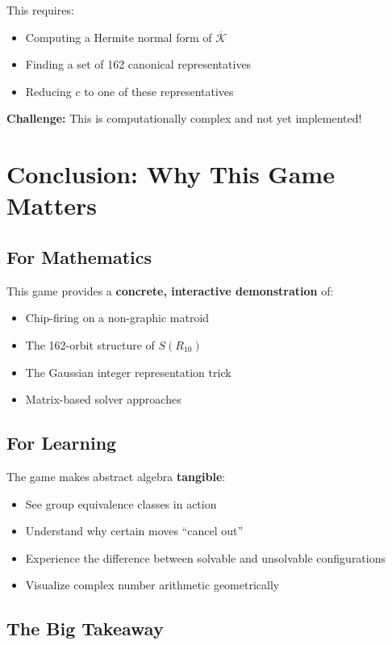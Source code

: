 \documentclass[11pt]{article}
\begin{document}
This requires:
\begin{itemize}
    \item Computing a Hermite normal form of $\overline{\mathcal{K}}$
    \item Finding a set of 162 canonical representatives
    \item Reducing $c$ to one of these representatives
\end{itemize}

\textbf{Challenge:} This is computationally complex and not yet implemented!

\section{Conclusion: Why This Game Matters}

\subsection{For Mathematics}

This game provides a \textbf{concrete, interactive demonstration} of:
\begin{itemize}
    \item Chip-firing on a non-graphic matroid
    \item The 162-orbit structure of $S(R_{10})$
    \item The Gaussian integer representation trick
    \item Matrix-based solver approaches
\end{itemize}

\subsection{For Learning}

The game makes abstract algebra \textbf{tangible}:
\begin{itemize}
    \item See group equivalence classes in action
    \item Understand why certain moves ``cancel out''
    \item Experience the difference between solvable and unsolvable configurations
    \item Visualize complex number arithmetic geometrically
\end{itemize}

\subsection{The Big Takeaway}
\end{document}
